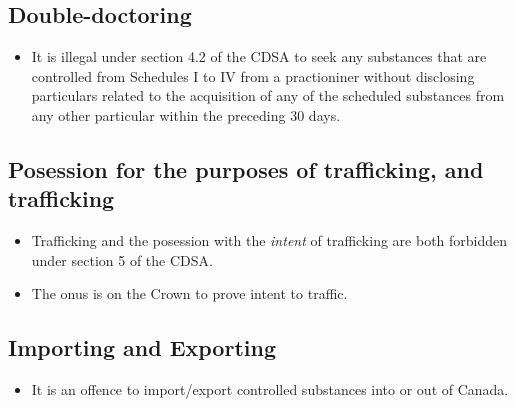 \documentclass{article}
\begin{document}
\subsection{Double-doctoring}
\begin{itemize}
    \item It is illegal under section 4.2 of the CDSA to seek any substances that are controlled from Schedules I to IV from a practioniner without disclosing particulars related to the acquisition of any of the scheduled substances from any other particular within the preceding 30 days.
\end{itemize}

\subsection{Posession for the purposes of trafficking, and trafficking}
\begin{itemize}
    \item Trafficking and the posession with the \emph{intent} of trafficking are both forbidden under section 5 of the CDSA.
    \item The onus is on the Crown to prove intent to traffic.
\end{itemize}

\subsection{Importing and Exporting}
\begin{itemize}
    \item It is an offence to import/export controlled substances into or out of Canada.
\end{itemize}
\end{document}
